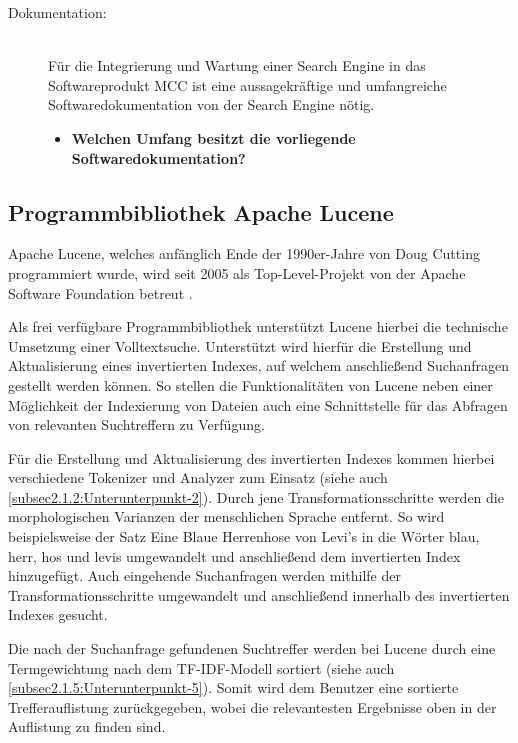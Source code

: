 \begin{description}
    \item[Dokumentation:]\hfill \\
    Für die Integrierung und Wartung einer Search Engine in das Softwareprodukt MCC ist eine aussagekräftige und umfangreiche Softwaredokumentation von der Search Engine nötig.

    \begin{itemize}
        \item \textbf{Welchen Umfang besitzt die vorliegende Softwaredokumentation?}
    \end{itemize}

\end{description}

\subsection{Programmbibliothek \glqq Apache Lucene\grqq{}\label{subsec4.1.2:Unterunterpunkt-2}}

Apache Lucene, welches anfänglich Ende der 1990er-Jahre von Doug Cutting programmiert wurde, wird seit 2005 als Top-Level-Projekt von der Apache Software Foundation betreut \cite{StefanLuber.2018}.

Als frei verfügbare Programmbibliothek unterstützt Lucene hierbei die technische Umsetzung einer Volltextsuche. Unterstützt wird hierfür die Erstellung und Aktualisierung eines invertierten Indexes, auf welchem anschließend Suchanfragen gestellt werden können. So stellen die Funktionalitäten von Lucene neben einer Möglichkeit der Indexierung von Dateien auch eine Schnittstelle für das Abfragen von relevanten Suchtreffern zu Verfügung.

Für die Erstellung und Aktualisierung des invertierten Indexes kommen hierbei verschiedene Tokenizer und Analyzer zum Einsatz (siehe auch \autoref{subsec2.1.2:Unterunterpunkt-2}). Durch jene Transformationsschritte werden die morphologischen Varianzen der menschlichen Sprache entfernt. So wird beispielsweise der Satz \glqq Eine Blaue Herrenhose von Levi's\textregistered\grqq{} in die Wörter \glqq blau\grqq{}, \glqq herr\grqq{}, \glqq hos\grqq{} und \glqq levis\grqq{} umgewandelt und anschließend dem invertierten Index hinzugefügt. Auch eingehende Suchanfragen werden mithilfe der Transformationsschritte umgewandelt und anschließend innerhalb des invertierten Indexes gesucht.

Die nach der Suchanfrage gefundenen Suchtreffer werden bei Lucene durch eine Termgewichtung nach dem \glqq TF-IDF\grqq{}-Modell sortiert (siehe auch \autoref{subsec2.1.5:Unterunterpunkt-5}). Somit wird dem Benutzer eine sortierte Trefferauflistung zurückgegeben, wobei die relevantesten Ergebnisse oben in der Auflistung zu finden sind.

